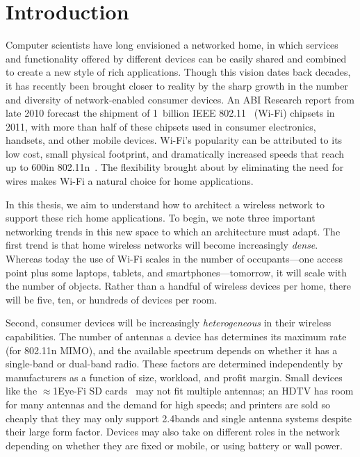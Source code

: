 \section{Introduction}
\label{sec:intro}

Computer scientists have long envisioned a networked home, in which services and functionality offered by different devices can be easily shared and combined to create a new style of rich applications. Though this vision dates back decades, it has recently been brought closer to reality by the sharp growth in the number and diversity of network-enabled consumer devices. An ABI Research report from late 2010 forecast the shipment of 1~billion IEEE 802.11~\cite{80211} (Wi-Fi) chipsets in 2011, with more than half of these chipsets used in consumer electronics, handsets, and other mobile devices. Wi-Fi's popularity can be attributed to its low cost, small physical footprint, and dramatically increased speeds that reach up to 600\Mbps in 802.11n~\cite{80211n}. The flexibility brought about by eliminating the need for wires makes Wi-Fi a natural choice for home applications.

In this thesis, we aim to understand how to architect a wireless network to support these rich home applications. To begin, we note three important networking trends in this new space to which an architecture must adapt. The first trend is that home wireless networks will become increasingly \emph{dense}. Whereas today the use of Wi-Fi scales in the number of occupants---one access point plus some laptops, tablets, and smartphones---tomorrow, it will scale with the number of objects. Rather than a handful of wireless devices per home, there will be five, ten, or hundreds of devices per room.

Second, consumer devices will be increasingly \emph{heterogeneous} in their wireless capabilities. The number of antennas a device has determines its maximum rate (for 802.11n MIMO), and the available spectrum depends on whether it has a single-band or dual-band radio. These factors are determined independently by manufacturers as a function of size, workload, and profit margin. Small devices like the $\approx$1\insq Eye-Fi SD cards~\cite{eyefi} may not fit multiple antennas; an HDTV has room for many antennas and the demand for high speeds; and printers are sold so cheaply that they may only support 2.4\GHz bands and single antenna systems despite their large form factor. Devices may also take on different roles in the network depending on whether they are fixed or mobile, or using battery or wall power.

